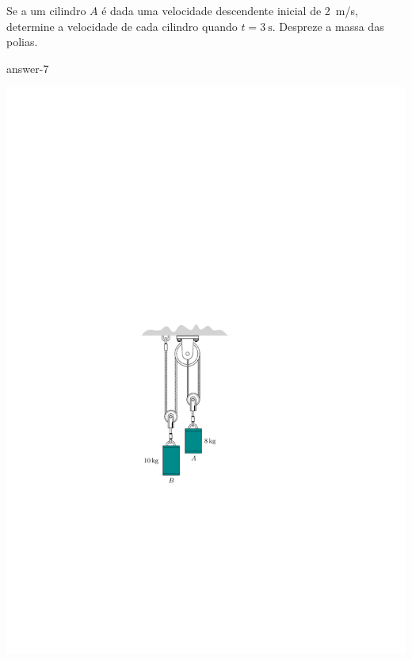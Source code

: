 \item Se a um cilindro $A$ é dada uma velocidade descendente inicial de \SI{2}{\meter/\second}, determine a velocidade de cada cilindro quando $t=\SI{3}{\second}$. Despreze a massa das polias.

{answer-7}

\vspace{-1.8cm}
\begin{flushright}
	\includegraphics[scale=1.3]{images/draw_7}
\end{flushright}